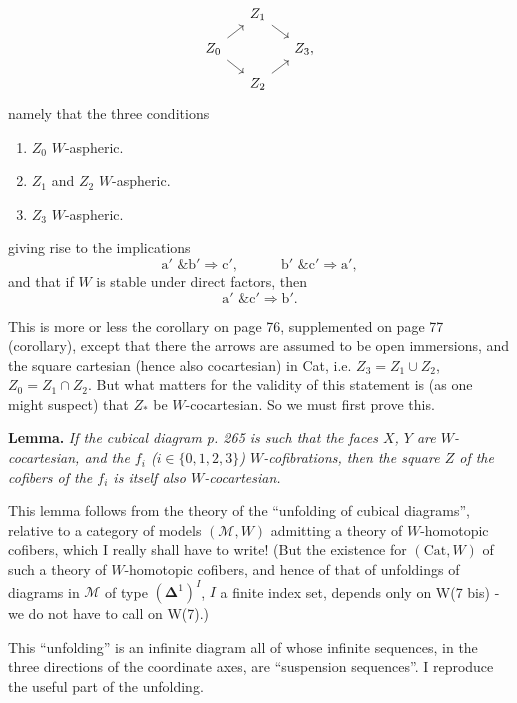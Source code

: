 \documentclass[11pt]{article}
\newcommand{\printedpage}[1]{\marginpar{\footnotesize p.~#1}}
\newcommand{\msp}[1]{\marginpar{\footnotesize [#1]}}
\begin{document}
\printedpage{174}
\[
\begin{tikzcd}[ampersand replacement=\&, row sep=small, column sep=small]
 \& Z_1 \arrow[dr] \& \\
Z_0 \arrow[ur] \arrow[dr] \& \& Z_3, \\
 \& Z_2 \arrow[ur] \&
\end{tikzcd}
\]
namely that the three conditions
\begin{enumerate}[label={}]
\item[a$'$)] $Z_0$ $W$-aspheric.
\item[b$'$)] $Z_1$ and $Z_2$ $W$-aspheric.
\item[c$'$)] $Z_3$ $W$-aspheric.
\end{enumerate}
giving rise to the implications
\[
\mathrm{a}' \text{ \& } \mathrm{b}' \Longrightarrow \mathrm{c}', \qquad\quad \mathrm{b}' \text{ \& } \mathrm{c}' \Longrightarrow \mathrm{a}',
\]
and that if $W$ is stable under direct factors, then
\[
\mathrm{a}' \text{ \& } \mathrm{c}' \Longrightarrow \mathrm{b}'.
\]

This is more or less the corollary on page 76, supplemented on page 77 (corollary), except that there the arrows are assumed to be open immersions, and the square cartesian (hence also cocartesian) in Cat, i.e. $Z_3 = Z_1 \cup Z_2$, $Z_0 = Z_1 \cap Z_2$. But
\msp{page 268}
what matters for the validity of this statement is (as one might suspect) that $Z_*$ be $W$-cocartesian. So we must first prove this.

\textbf{Lemma.} \textit{If the cubical diagram p. 265 is such that the faces $X$, $Y$ are $W$-cocartesian, and the $f_i$ ($i \in \{0,1,2,3\}$) $W$-cofibrations, then the square $Z$ of the cofibers of the $f_i$ is itself also $W$-cocartesian.}

This lemma follows from the theory of the ``unfolding of cubical diagrams'', relative to a category of models $(\mathcal{M}, W)$ admitting a theory of $W$-homotopic cofibers, which I really shall have to write! (But the existence for $(\mathrm{Cat}, W)$ of such a theory of $W$-homotopic cofibers, and hence of that of unfoldings of diagrams in $\mathcal{M}$ of type $(\boldsymbol{\Delta}^1)^I$, $I$ a finite index set, depends only on W(7 bis) - we do not have to call on W(7).)

\msp{page 269}
This ``unfolding'' is an infinite diagram all of whose infinite sequences, in the three directions of the coordinate axes, are ``suspension sequences''. I reproduce the useful part of the unfolding. %
\end{document}
